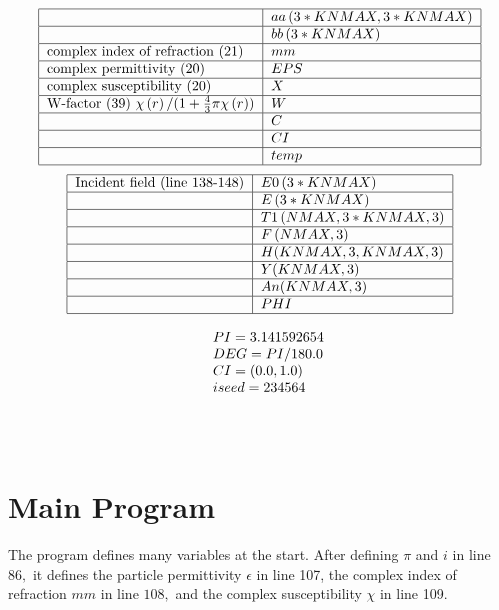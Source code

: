 \documentclass{article}
\begin{document}
\[
\begin{tabular}{|l|l|}
\hline
& $aa\left( 3\ast KNMAX,3\ast KNMAX\right) $ \\ \hline
& $bb\left( 3\ast KNMAX\right) $ \\ \hline
complex index of refraction (21) & $mm$ \\ \hline
complex permittivity (20) & $EPS$ \\ \hline
complex susceptibility (20) & $X$ \\ \hline
W-factor (39) $\chi \left( r\right) /(1+\frac{4}{3}\pi \chi \left( r\right) )
$ & $W$ \\ \hline
& $C$ \\ \hline
& $CI$ \\ \hline
& $temp$ \\ \hline
\end{tabular}%
\]%
\[
\begin{tabular}{|l|l|}
\hline
Incident field (line 138-148) & $E0\left( 3\ast KNMAX\right) $ \\ \hline
& $E\left( 3\ast KNMAX\right) $ \\ \hline
& $T1\left( NMAX,3\ast KNMAX,3\right) $ \\ \hline
& $F\left( NMAX,3\right) $ \\ \hline
& $H(KNMAX,3,KNMAX,3)$ \\ \hline
& $Y(KNMAX,3)$ \\ \hline
& $An(KNMAX,3)$ \\ \hline
& $PHI$ \\ \hline
\end{tabular}%
\]

\[
\begin{tabular}{ll}
& $PI=3.141592654$ \\ 
& $DEG=PI/180.0$ \\ 
& $CI=(0.0,1.0)$ \\ 
& $iseed=234564$ \\ 
&  \\ 
&  \\ 
& 
\end{tabular}%
\]

\section{Main Program}

The program defines many variables at the start. After defining $\pi $ and $i
$ in line $86,$ it defines the particle permittivity $\epsilon $ in line
107, the complex index of refraction $mm$ in line $108,$ and the complex
susceptibility $\chi $ in line 109.
\end{document}

